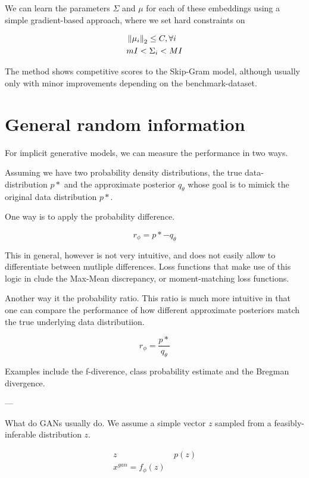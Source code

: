\documentclass[a4paper,12pt,twoside,openright]{report}
\begin{document}
We can learn the parameters $\Sigma$ and $\mu$ for each of these embeddings using a simple gradient-based approach, where we set hard constraints on 

\begin{align}
& \left\lVert \mu_i \right\rVert_2  \leq C, \forall i \\
& m I <  \Sigma_i < M I
\end{align}

The method shows competitive scores to the Skip-Gram model, although usually only with minor improvements depending on the benchmark-dataset.


\section{General random information}

For implicit generative models, we can measure the performance in two ways.

Assuming we have two probability density distributions, the true data-distribution $p*$ and the approximate posterior $q_\theta$ whose goal is to mimick the original data distribution $p*$.

One way is to apply the probability difference.

\begin{equation}
r_{\phi} = p* - q_\theta
\end{equation}

This in general, however is not very intuitive, and does not easily allow to differentiate between mutliple differences.
Loss functions that make use of this logic in clude the Max-Mean discrepancy, or moment-matching loss functions.

Another way it the probability ratio.
This ratio is much more intuitive in that one can compare the performance of how different approximate posteriors match the true underlying data distributiion.

\begin{equation}
r_{\phi} = \frac{p*}{q_\theta}
\end{equation}

Examples include the f-diverence, class probability estimate and the Bregman divergence.

---

What do GANs usually do.
We assume a simple vector $z$ sampled from a feasibly-inferable distribution $z$.

\begin{align}
z &~ p(z) \\
x^{gan} = f_\phi(z)
\end{align}
\end{document}
